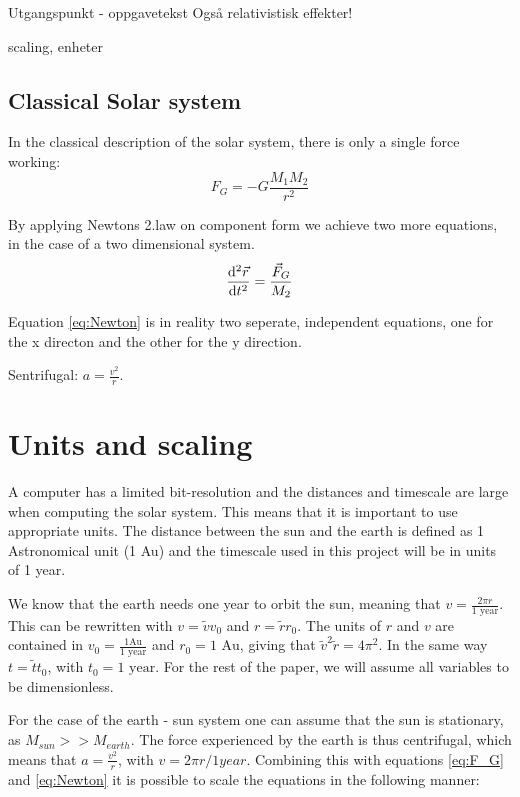 Utgangspunkt - oppgavetekst
	Også relativistisk effekter!
	
scaling, enheter






\subsection{Classical Solar system}
In the classical description of the solar system, there is only a single force working:
\begin{equation}
 F_G = - G\frac{M_{1}M_2}{r ^2} \label{eq:F_G}
\end{equation}

By applying Newtons 2.law on component form we achieve two more equations, in the case of a two dimensional system. 
\begin{equation}
\dv[2]{\vec{r	}}{t} = \frac{\vec{F}_G}{M_2} \label{eq:Newton}
\end{equation}

Equation \ref{eq:Newton} is in reality two seperate, independent equations, one for the x directon and the other for the y direction. 
 
Sentrifugal: $ a = \frac{v^2}{r} $. 


\section{Units and scaling}

A computer has a limited bit-resolution and the distances and timescale are large when computing the solar system. This means that it is important to use appropriate units. The distance between the sun and the earth is defined as 1 Astronomical unit (1 Au) and the timescale used in this project will be in units of 1 year. 

We know that the earth needs one year to orbit the sun, meaning that $ v = \frac{2\pi r}{\text{1 year}} $. This can be rewritten with $ v = \tilde{v}v_0 $ and $ r = \tilde{r}r_0 $. The units of $ r $ and $ v $ are contained in  $ v_0 = \frac{1 \text{Au}}{1 \text{ year}} $ and $ r_0=1\text{ Au} $, giving that $ \tilde{v}^2\tilde{r} = 4\pi^2 $. In the same way $ t = \tilde{t}t_0 $, with $ t_0 = 1 \text{ year} $. For the rest of the paper, we will assume all variables to be dimensionless.

For the case of the earth - sun system one can assume that the sun is stationary, as $ M_{sun}>> M_{earth} $. The force experienced by the earth is thus centrifugal, which means that $ a = \frac{v^2}{r} $, with $ v = 2\pi r /1year $.  
Combining this with equations \ref{eq:F_G} and \ref{eq:Newton} it is possible to scale the equations in the following manner:

